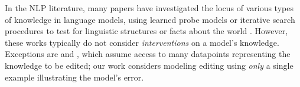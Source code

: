 \documentclass{article}
\makeatletter
\let\origsection\section
\renewcommand\section{\@ifstar{\starsection}{\nostarsection}}
\newcommand\nostarsection[1]
{\sectionprelude\origsection{#1}\sectionpostlude}
\newcommand\starsection[1]
{\sectionprelude\origsection*{#1}\sectionpostlude}
\newcommand\sectionprelude{%
  \vspace{-1.5mm}
}
\newcommand\sectionpostlude{%
  \vspace{-2mm}
}
\makeatother
\begin{document}
In the NLP literature, many papers have investigated the locus of various types of knowledge in language models, using learned probe models or iterative search procedures to test for linguistic structures \citep{belinkov-etal-2017-neural,conneau-etal-2018-cram,hewitt-manning-2019-structural} or facts about the world \citep{petroni-etal-2019-language,Jiang2020HowCW,dai2021knowledge}. However, these works typically do not consider \textit{interventions} on a model's knowledge. Exceptions are \citet{dai2021knowledge} and \citet{wang2020kadapter}, which assume access to many datapoints representing the knowledge to be edited; our work considers modeling editing using \textit{only} a single example illustrating the model's error.

\section{Experiments}
\end{document}
